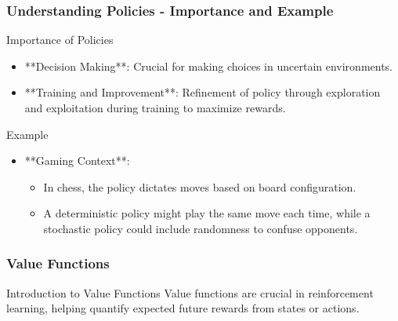 \documentclass[aspectratio=169]{beamer}
\begin{document}
\begin{frame}[fragile]
    \frametitle{Understanding Policies - Importance and Example}
    \begin{block}{Importance of Policies}
        \begin{itemize}
            \item **Decision Making**: Crucial for making choices in uncertain environments.
            \item **Training and Improvement**: Refinement of policy through exploration and exploitation during training to maximize rewards.
        \end{itemize}
    \end{block}
    \begin{block}{Example}
        \begin{itemize}
            \item **Gaming Context**: 
            \begin{itemize}
                \item In chess, the policy dictates moves based on board configuration. 
                \item A deterministic policy might play the same move each time, while a stochastic policy could include randomness to confuse opponents.
            \end{itemize}
        \end{itemize}
    \end{block}
\end{frame}

\begin{frame}[fragile]
    \frametitle{Value Functions}
    \begin{block}{Introduction to Value Functions}
        Value functions are crucial in reinforcement learning, helping quantify expected future rewards from states or actions.
    \end{block}
\end{frame}
\end{document}
